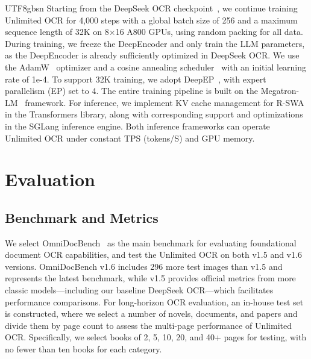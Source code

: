 \documentclass[11pt, a4paper, logo, copyright, nonumbering]{deepseek}
\begin{document}
\begin{CJK*}{UTF8}{gbsn}
Starting from the DeepSeek OCR checkpoint~\cite{wei2025deepseek}, we continue training Unlimited OCR for 4,000 steps with a global batch size of 256 and a maximum sequence length of 32K on 8$\times$16 A800 GPUs, using random packing for all data. During training, we freeze the DeepEncoder and only train the LLM parameters, as the DeepEncoder is already sufficiently optimized in DeepSeek OCR. We use the AdamW~\cite{AdamW} optimizer and a cosine annealing scheduler~\cite{loshchilov2016sgdr} with an initial learning rate of 1e-4. To support 32K training, we adopt DeepEP~\cite{deepseek32}, with expert parallelism (EP) set to 4. The entire training pipeline is built on the Megatron-LM~\cite{megatron-lm} framework. For inference, we implement KV cache management for R-SWA in the Transformers library, along with corresponding support and optimizations in the SGLang inference engine. Both inference frameworks can operate Unlimited OCR under constant TPS (tokens/S) and GPU memory.


\section{Evaluation}


\subsection{Benchmark and Metrics}

We select OmniDocBench~\cite{ouyang2025omnidocbench} as the main benchmark for evaluating foundational document OCR capabilities, and test the Unlimited OCR on both v1.5 and v1.6 versions. OmniDocBench v1.6 includes 296 more test images than v1.5 and represents the latest benchmark, while v1.5 provides official metrics from more classic models—including our baseline DeepSeek OCR—which facilitates performance comparisons. For long-horizon OCR evaluation, an in-house test set is constructed, where we select a number of novels, documents, and papers and divide them by page count to assess the multi-page performance of Unlimited OCR. Specifically, we select books of 2, 5, 10, 20, and 40+ pages for testing, with no fewer than ten books for each category.




\end{CJK*}
\end{document}

